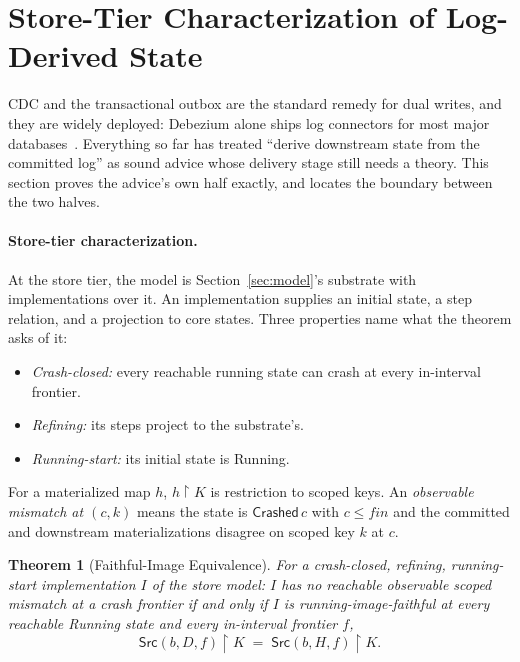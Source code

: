 \documentclass[sigplan,10pt]{acmart}
\theoremstyle{plain}
\newtheorem{theorem}{Theorem}
\theoremstyle{definition}
\newcommand{\Src}{\mathsf{Src}}            %
\newcommand{\scope}{K}                     %
\newcommand{\fin}{\mathit{fin}}            %
\newcommand{\rst}{\mathbin{\restriction}}  %
\newcommand{\Running}{\textsf{Running}}
\newcommand{\Crashed}{\textsf{Crashed}}
\begin{document}
\section{Store-Tier Characterization of Log-Derived State}\label{sec:store}

CDC and the transactional outbox are the standard remedy for dual
writes, and they are widely deployed: Debezium alone ships log
connectors for most major databases~\cite{debezium}. Everything so far
has treated ``derive downstream state from the committed log'' as
sound advice whose delivery stage still needs a theory. This section
proves the advice's own half exactly, and locates the boundary between
the two halves.

\paragraph{Store-tier characterization.}
At the store tier, the model is Section~\ref{sec:model}'s substrate
with implementations over it. An implementation supplies an initial
state, a step relation, and a projection to core states. Three
properties name what the theorem asks of it:
\begin{itemize}
\item[R1.] \emph{Crash-closed:} every reachable running state can crash at every
  in-interval frontier.
\item[R2.] \emph{Refining:} its steps project to the substrate's.
\item[R3.] \emph{Running-start:} its initial state is \Running.
\end{itemize}
For a materialized map $h$, $h\rst\scope$ is restriction to scoped
keys. An \emph{observable mismatch at $(c,k)$} means the state is
$\Crashed\,c$ with $c\leq\fin$ and the committed and downstream
materializations disagree on scoped key $k$ at $c$.

\begin{theorem}[Faithful-Image Equivalence]\label{thm:image}
For a crash-closed, refining, running-start implementation $I$ of the
store model: $I$ has no reachable observable scoped mismatch at a
crash frontier if and only if $I$ is running-image-faithful at every
reachable \Running{} state and every in-interval frontier $f$,
\[
  \Src(b,D,f)\rst\scope \;=\; \Src(b,H,f)\rst\scope .
\]
\end{theorem}
\end{document}
